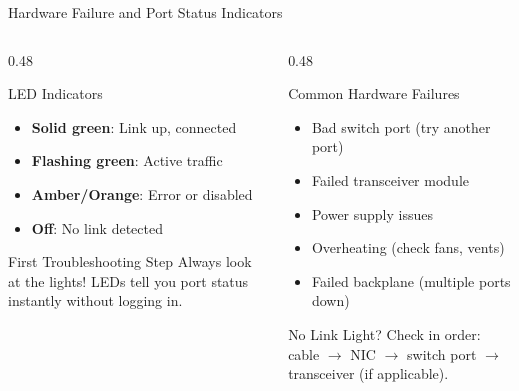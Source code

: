 \documentclass[aspectratio=169]{beamer}  %
\begin{document}

\begin{frame}{Hardware Failure and Port Status Indicators}
    \begin{columns}[T]
        \begin{column}{0.48\textwidth}
            \begin{block}{LED Indicators}
                \begin{itemize}
                    \item \textcolor{networkgreen}{\textbf{Solid green}}: Link up, connected
                    \item \textcolor{networkgreen}{\textbf{Flashing green}}: Active traffic
                    \item \textcolor{aborange}{\textbf{Amber/Orange}}: Error or disabled
                    \item \textbf{Off}: No link detected
                \end{itemize}
            \end{block}
            
            \vspace{0.3em}
            \begin{alertblock}{First Troubleshooting Step}
                Always look at the lights! LEDs tell you port status instantly without logging in.
            \end{alertblock}
        \end{column}
        \begin{column}{0.48\textwidth}
            \begin{block}{Common Hardware Failures}
                \begin{itemize}
                    \item Bad switch port (try another port)
                    \item Failed transceiver module
                    \item Power supply issues
                    \item Overheating (check fans, vents)
                    \item Failed backplane (multiple ports down)
                \end{itemize}
            \end{block}
            
            \vspace{0.3em}
            \begin{exampleblock}{No Link Light?}
                Check in order: cable $\rightarrow$ NIC $\rightarrow$ switch port $\rightarrow$ transceiver (if applicable).
            \end{exampleblock}
        \end{column}
    \end{columns}
\end{frame}
\end{document}
